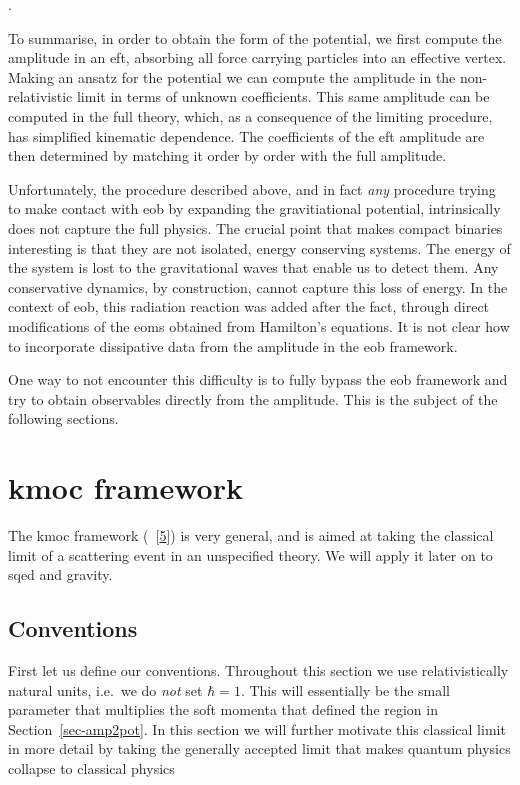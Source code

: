 \documentclass[
  11pt,
  a4paper,
  DIV=11,
  numbers=noendperiod,
  twoside]{scrreprt}
\let\[\relax \let\]\relax %
\DeclareRobustCommand{\[}{\begin{equation}}
\DeclareRobustCommand{\]}{\end{equation}}
\begin{document}
\[ \abs{\tv{\vel}}.\]

To summarise, in order to obtain the form of the potential, we first
compute the amplitude in an \gls{eft}, absorbing all force carrying
particles into an effective vertex. Making an ansatz for the potential
we can compute the amplitude in the non-relativistic limit in terms of
unknown coefficients. This same amplitude can be computed in the full
theory, which, as a consequence of the limiting procedure, has
simplified kinematic dependence. The coefficients of the \gls{eft}
amplitude are then determined by matching it order by order with the
full amplitude.

Unfortunately, the procedure described above, and in fact \emph{any}
procedure trying to make contact with \gls{eob} by expanding the
gravitiational potential, intrinsically does not capture the full
physics. The crucial point that makes compact binaries interesting is
that they are not isolated, energy conserving systems. The energy of the
system is lost to the gravitational waves that enable us to detect them.
Any conservative dynamics, by construction, cannot capture this loss of
energy. In the context of \gls{eob}, this radiation reaction was added
after the fact, through direct modifications of the \gls{eom}s obtained
from Hamilton's equations. It is not clear how to incorporate
dissipative data from the amplitude in the \gls{eob} framework.

One way to not encounter this difficulty is to fully bypass the
\gls{eob} framework and try to obtain observables directly from the
amplitude. This is the subject of the following sections.

\hypertarget{sec-kmoc}{%
\section{\texorpdfstring{\acrshort{kmoc}
framework}{ framework}}\label{sec-kmoc}}

The \acrfull{kmoc} framework
(~{[}\protect\hyperlink{ref-Kosower:2018adc}{5}{]}) is very general, and
is aimed at taking the classical limit of a scattering event in an
unspecified theory. We will apply it later on to \gls{sqed} and gravity.

\hypertarget{conventions}{%
\subsection{Conventions}\label{conventions}}

First let us define our conventions. Throughout this section we use
relativistically natural units, i.e.~we do \emph{not} set \(\hbar=1\).
This will essentially be the small parameter that multiplies the soft
momenta that defined the region in Section~\ref{sec-amp2pot}. In this
section we will further motivate this classical limit in more detail by
taking the generally accepted limit that makes quantum physics collapse
to classical physics
\end{document}
